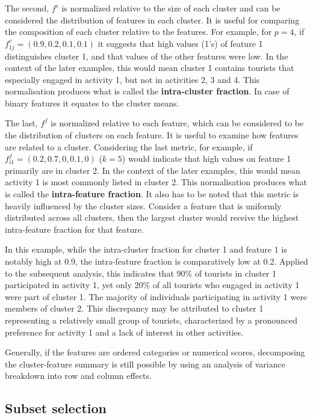 \documentclass[article]{ajs}
\begin{document}
The second, $f^c$ is normalized relative to the size of each cluster and can be considered the distribution of features in each cluster. It is useful for comparing the composition of each cluster relative to the features. For example, for $p=4$, if $f^c_{1j} = (0.9, 0.2, 0.1, 0.1)$ it suggests that high values (1's) of feature 1 distinguishes cluster 1, and that values of the other  features were low. In the context of the later examples, this would mean cluster 1 contains tourists that especially engaged in activity 1, but not in activities 2, 3 and 4. This normalisation produces what is called the {\bf intra-cluster fraction}. In case of binary features it equates to the cluster means.

The last, $f^f$ is normalized relative to each feature, which can be considered to be the distribution of clusters on each feature. It is useful to examine how features are related to a cluster. Considering the last metric, for example, if $f^f_{i1} = (0.2, 0.7, 0, 0.1, 0)$ ($k=5$) would indicate that high values on feature 1 primarily are in cluster 2. In the context of the later examples, this would mean activity 1 is most commonly listed in cluster 2. This normalisation produces what is called the {\bf intra-feature fraction}. It also has to be noted that this metric is heavily influenced by the cluster sizes. Consider a feature that is uniformly distributed across all clusters, then the largest cluster would receive the highest intra-feature fraction for that feature.

In this example, while the intra-cluster fraction for cluster 1 and feature 1 is notably high at 0.9, the intra-feature fraction is comparatively low at 0.2. Applied to the subsequent analysis, this indicates that 90\% of tourists in cluster 1 participated in activity 1, yet only 20\% of all tourists who engaged in activity 1 were part of cluster 1. The majority of individuals participating in activity 1 were members of cluster 2. This discrepancy may be attributed to cluster 1 representing a relatively small group of tourists, characterized by a pronounced preference for activity 1 and a lack of interest in other activities.

Generally, if the features are ordered categories or numerical scores, decomposing the cluster-feature summary is still possible by using an analysis of variance breakdown into row and column effects.

\subsection{Subset selection}
\end{document}
